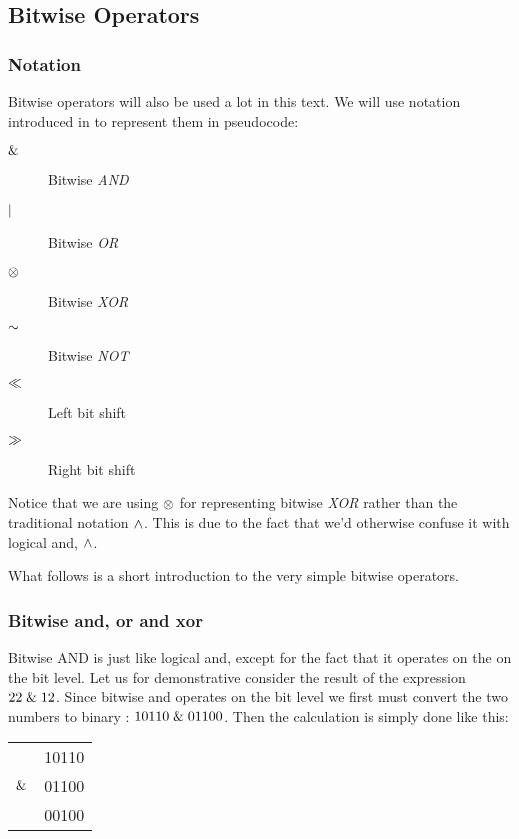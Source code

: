 \subsection{Bitwise Operators}
\label{sec:bitwise-operators}

\subsubsection{Notation}

Bitwise operators will also be used a lot in this text. We will use
notation introduced in \C{}\cite{kernighan1988c} to represent them in
pseudocode:

\begin{description}
\item[$\mathrel{\&}$] Bitwise \textit{AND}
\item[$\mathrel{|}$] Bitwise \textit{OR}
\item[$\mathrel{\otimes}$] Bitwise \textit{XOR}
\item[$\mathord{\sim}$] Bitwise \textit{NOT}
\item[$\ll$] Left bit shift
\item[$\gg$] Right bit shift
\end{description}

Notice that we are using $\mathrel{\otimes}$ for representing bitwise
\textit{XOR} rather than the traditional \C notation $\wedge$. This is due to
the fact that we'd otherwise confuse it with logical and, $\wedge$.

What follows is a short introduction to the very simple bitwise
operators.

\subsubsection{Bitwise and, or and xor}

Bitwise AND is just like logical and, except for the fact that it
operates on the on the bit level. Let us for demonstrative consider
the result of the expression $22 \mathrel{\&} 12$. Since bitwise and
operates on the bit level we first must convert the two numbers to
binary : $10110 \mathrel{\&} 01100$. Then the calculation is simply done
like this:

\begin{center}
  \begin{tabular}{lr}
              & 10110  \\
    $\mathrel{\&}$ & 01100 \\
    \hline
              & 00100 \\
  \end{tabular}
\end{center}

